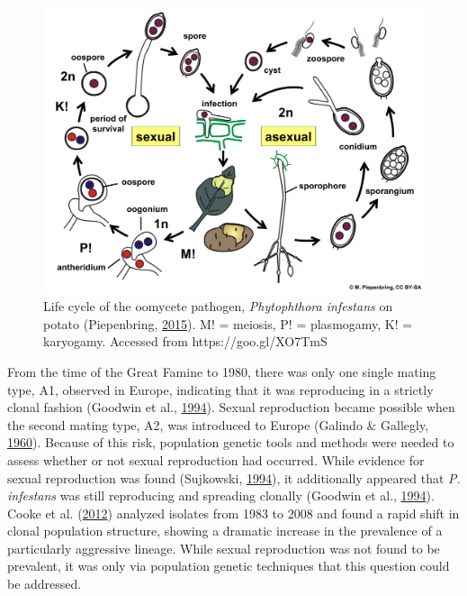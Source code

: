 \documentclass[double,11pt]{beavtex}
\begin{document}
  \begin{figure}
  
  {\centering \includegraphics[width=0.8\linewidth]{figure/introduction/Pinfestans_life} 
  
  }
  
  \caption[Life cycle of the oomycete pathogen, \emph{Phytophthora infestans} on
  potato (Piepenbring,
  \protect\hyperlink{ref-piepenbring2015infestans}{2015}). M! = meiosis,
  P! = plasmogamy, K! = karyogamy. Accessed from https://goo.gl/XO7TmS]{Life cycle of the oomycete pathogen, \emph{Phytophthora infestans} on
  potato (Piepenbring,
  \protect\hyperlink{ref-piepenbring2015infestans}{2015}). M! = meiosis,
  P! = plasmogamy, K! = karyogamy. Accessed from https://goo.gl/XO7TmS}\label{fig:pinflife}
  \end{figure}
  
  From the time of the Great Famine to 1980, there was only one single
  mating type, A1, observed in Europe, indicating that it was reproducing
  in a strictly clonal fashion (Goodwin et al.,
  \protect\hyperlink{ref-goodwin1994panglobal}{1994}). Sexual reproduction
  became possible when the second mating type, A2, was introduced to
  Europe (Galindo \& Gallegly,
  \protect\hyperlink{ref-galindo1960nature}{1960}). Because of this risk,
  population genetic tools and methods were needed to assess whether or
  not sexual reproduction had occurred. While evidence for sexual
  reproduction was found (Sujkowski,
  \protect\hyperlink{ref-sujkowski1994increased}{1994}), it additionally
  appeared that \emph{P. infestans} was still reproducing and spreading
  clonally (Goodwin et al.,
  \protect\hyperlink{ref-goodwin1994panglobal}{1994}). Cooke et al.
  (\protect\hyperlink{ref-cooke2012genome}{2012}) analyzed isolates from
  1983 to 2008 and found a rapid shift in clonal population structure,
  showing a dramatic increase in the prevalence of a particularly
  aggressive lineage. While sexual reproduction was not found to be
  prevalent, it was only via population genetic techniques that this
  question could be addressed.
  
\end{document}
